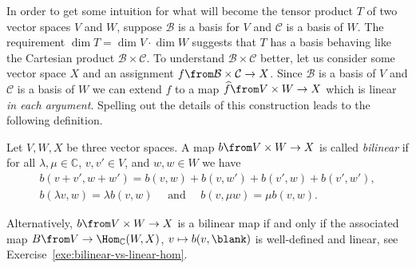 \documentclass[a4paper,oneside, 12pt]{amsart}
\begin{document}
In order to get some intuition for what will become the tensor product \(T\) of two vector spaces \(V\) and \(W\), suppose \(\mathcal{B}\) is a basis for \(V\) and \(\mathcal{C}\) is a basis of \(W\).
The requirement \(\dim T = \dim V \cdot \dim W\) suggests that \(T\) has a basis behaving like the Cartesian  product \( \mathcal{B} \times \mathcal{C} \).
To understand \(\mathcal{B}\times \mathcal{C}\) better, let us consider some vector space \(X\) and an assignment \(f\from \mathcal{B}\times \mathcal{C} \to X \).
Since \(\mathcal{B}\) is a basis of \(V\) and \(\mathcal{C}\) is a basis of \(W\) we can extend \(f\) to a map \(\widehat{f} \from V\times W \to X\) which is linear \emph{in each argument}.
Spelling out the details of this construction leads to the following definition.

\begin{definition}\label{def:bilinear-map}
  Let \(V,W,X\) be three vector spaces.
  A map \(b \from V\times W\to X\) is called \emph{bilinear} if for all \(\lambda, \mu \in \mathbb{C}\), \(v,v' \in V\), and \(w,w \in W\) we have
  \begin{subequations}
    \begin{gather}
      b(v+v', w+w') = b(v, w) + b(v, w') + b(v', w) + b(v', w'), \\
      b(\lambda v, w) = \lambda b(v, w) \quad  \text{ and }\quad
      b(v, \mu w) = \mu b(v, w).
    \end{gather}
  \end{subequations}
\end{definition}
Alternatively, \(b\from V\times W \to X\) is a bilinear map if and only if the associated map \(B \from V\to \Hom_{ \mathbb{C}}(W,X)\), \(v\mapsto b(v, \blank)\) is well-defined and linear, see Exercise~\ref{exe:bilinear-vs-linear-hom}.
\end{document}
